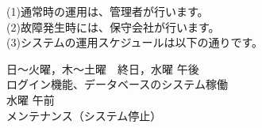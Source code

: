 \begin{minipage}[h]{150mm}
(1)通常時の運用は、管理者が行います。\\
(2)故障発生時には、保守会社が行います。\\
(3)システムの運用スケジュールは以下の通りです。\\
\end{minipage}

\hspace{1cm}
\begin{minipage}[h]{140mm}
日〜火曜，木〜土曜　終日，水曜 午後\\
\hspace{5mm}
ログイン機能、データベースのシステム稼働\\
水曜 午前\\
\hspace{5mm}
メンテナンス（システム停止） \\
\end{minipage}
